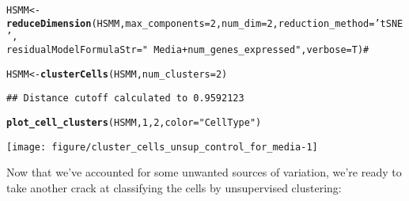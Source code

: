 \documentclass[10pt,oneside]{article}\usepackage[]{graphicx}\usepackage[]{color}
\makeatletter
\def\maxwidth{ %
  \ifdim\Gin@nat@width>\linewidth
    \linewidth
  \else
    \Gin@nat@width
  \fi
}
\newcommand{\hlnum}[1]{\textcolor[rgb]{0.686,0.059,0.569}{#1}}%
\newcommand{\hlstr}[1]{\textcolor[rgb]{0.192,0.494,0.8}{#1}}%
\newcommand{\hlcom}[1]{\textcolor[rgb]{0.678,0.584,0.686}{\textit{#1}}}%
\newcommand{\hlstd}[1]{\textcolor[rgb]{0.345,0.345,0.345}{#1}}%
\newcommand{\hlkwb}[1]{\textcolor[rgb]{0.69,0.353,0.396}{#1}}%
\newcommand{\hlkwc}[1]{\textcolor[rgb]{0.333,0.667,0.333}{#1}}%
\newcommand{\hlkwd}[1]{\textcolor[rgb]{0.737,0.353,0.396}{\textbf{#1}}}%
\newenvironment{kframe}{%
 \def\at@end@of@kframe{}%
 \ifinner\ifhmode%
  \def\at@end@of@kframe{\end{minipage}}%
  \begin{minipage}{\columnwidth}%
 \fi\fi%
 \def\FrameCommand##1{\hskip\@totalleftmargin \hskip-\fboxsep
 \colorbox{shadecolor}{##1}\hskip-\fboxsep
     \hskip-\linewidth \hskip-\@totalleftmargin \hskip\columnwidth}%
 \MakeFramed {\advance\hsize-\width
   \@totalleftmargin\z@ \linewidth\hsize
   \@setminipage}}%
 {\par\unskip\endMakeFramed%
 \at@end@of@kframe}
\newenvironment{knitrout}{}{} %
\makeatother
\begin{document}
\begin{knitrout}
\color{fgcolor}\begin{kframe}
\begin{alltt}
\hlstd{HSMM} \hlkwb{<-} \hlkwd{reduceDimension}\hlstd{(HSMM,} \hlkwc{max_components}\hlstd{=}\hlnum{2}\hlstd{,} \hlkwc{num_dim} \hlstd{=} \hlnum{2}\hlstd{,} \hlkwc{reduction_method} \hlstd{=} \hlstr{'tSNE'}\hlstd{,}
                       \hlkwc{residualModelFormulaStr}\hlstd{=}\hlstr{"~Media + num_genes_expressed"}\hlstd{,} \hlkwc{verbose} \hlstd{= T)} \hlcom{#}
\end{alltt}


{\ttfamily\noindent\itshape\color{messagecolor}{\#\# Removing batch effects}}

{\ttfamily\noindent\itshape\color{messagecolor}{\#\# Remove noise by PCA ...}}

{\ttfamily\noindent\itshape\color{messagecolor}{\#\# Reduce dimension by tSNE ...}}\begin{alltt}
\hlstd{HSMM} \hlkwb{<-} \hlkwd{clusterCells}\hlstd{(HSMM,} \hlkwc{num_clusters}\hlstd{=}\hlnum{2}\hlstd{)}
\end{alltt}
\begin{verbatim}
## Distance cutoff calculated to 0.9592123
\end{verbatim}


{\ttfamily\noindent\itshape\color{messagecolor}{\#\# the length of the distance: 34191}}\begin{alltt}
\hlkwd{plot_cell_clusters}\hlstd{(HSMM,} \hlnum{1}\hlstd{,} \hlnum{2}\hlstd{,} \hlkwc{color}\hlstd{=}\hlstr{"CellType"}\hlstd{)}
\end{alltt}
\end{kframe}

{\centering \texttt{[image: figure/cluster\_cells\_unsup\_control\_for\_media-1]} 

}



\end{knitrout}

Now that we've accounted for some unwanted sources of variation, we're ready to take another crack at classifying the cells by unsupervised clustering:
\end{document}
